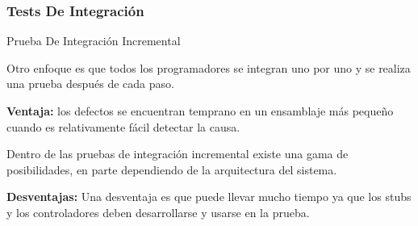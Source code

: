 \begin{frame}
    \frametitle{Tests De Integración}

    \begin{block}{Prueba De Integración Incremental}

        Otro enfoque es que todos los programadores se integran uno 
        por uno y se realiza una prueba después de cada paso.
        
        \textbf{Ventaja:} los defectos se encuentran temprano en un 
        ensamblaje más pequeño cuando es relativamente fácil 
        detectar la causa.
        
        Dentro de las pruebas de integración incremental existe una gama de posibilidades, en parte dependiendo de la arquitectura del sistema.
        
        \textbf{Desventajas:} Una desventaja es que puede llevar mucho 
        tiempo ya que los stubs y los controladores deben desarrollarse 
        y usarse en la prueba.
    \end{block}
\end{frame}

